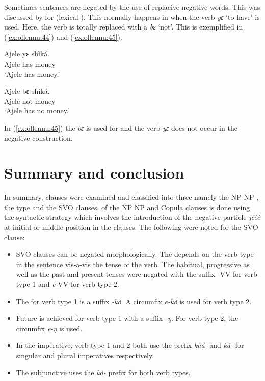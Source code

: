 \documentclass[output=paper,newtxmath,modfonts,nonflat,draftmode]{langsci/langscibook}
\begin{document}
Sometimes sentences are negated by the use of replacive negative words. This was discussed by \citet[23]{caesar2012} for  (lexical ). This normally happens in  when the verb \textit{yɛ} `to have' is used. Here, the verb is totally replaced with a  \textit{bɛ} `not'. This is exemplified in (\ref{ex:ollennu:44}) and (\ref{ex:ollennu:45}).


\ea \label{ex:ollennu:44}
\gll Ajele yɛ shìká.\\
Ajele has money\\
\glt `Ajele has money.'
\z


\ea \label{ex:ollennu:45}
\gll Ajele bɛ shíká.\\
Ajele not money\\
\glt`Ajele has no money.'
\z


In (\ref{ex:ollennu:45}) the  \textit{bɛ} is used for  and the verb \textit{yɛ} does not occur in the negative construction.

\section{\label{sec:ollennu:3} Summary and conclusion}

In summary,  clauses were examined and classified into three namely the NP NP , the  type and the SVO clauses.  of the NP NP and Copula clauses is done using the syntactic strategy which involves the introduction of the {negative particle} \textit{jééé} at initial or middle position in the clauses. The following were noted for the SVO clause:
\begin{itemize}
\item {} SVO clauses can be negated morphologically. The  depends on the verb type in the sentence vis-a-vis the tense of the verb. The habitual, progressive as well as the past and present tenses were negated with the suffix -VV for verb type 1 and \textit{e}-VV for verb type 2.

\item The   for verb type 1 is a suffix \textit{-kò}. A circumfix \textit{e-kò} is used for verb type 2.

\item Future  is achieved for verb type 1 with a suffix \textit{-ŋ}. For verb type 2, the circumfix \textit{e-ŋ} is used.

\item In the imperative, verb type 1 and 2 both use the prefix \textit{kàá-} and \textit{ká-} for singular and plural imperatives respectively.

\item The subjunctive  uses the \textit{ká-} prefix for both verb types.
\end{itemize}
\end{document}

